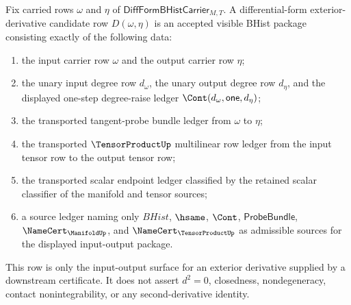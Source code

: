 \begin{definition}
\label{def:diffform-exterior-derivative-candidate-row}
Fix carried rows $\omega$ and $\eta$ of
$\mathsf{DiffFormBHistCarrier}_{M,T}$. A differential-form
exterior-derivative candidate row $D(\omega,\eta)$ is an accepted visible
BHist package consisting exactly of the following data:
\begin{enumerate}
  \item the input carrier row $\omega$ and the output carrier row $\eta$;
  \item the unary input degree row $d_\omega$, the unary output degree row
  $d_\eta$, and the displayed one-step degree-raise ledger
  $\Cont(d_\omega,\mathsf{one},d_\eta)$;
  \item the transported tangent-probe bundle ledger from $\omega$ to $\eta$;
  \item the transported $\TensorProductUp$ multilinear row ledger from the
  input tensor row to the output tensor row;
  \item the transported scalar endpoint ledger classified by the retained
  scalar classifier of the manifold and tensor sources;
  \item a source ledger naming only $BHist$, $\hsame$, $\Cont$,
  $\mathsf{ProbeBundle}$, $\NameCert_{\ManifoldUp}$, and
  $\NameCert_{\TensorProductUp}$ as admissible sources for the displayed
  input-output package.
\end{enumerate}
This row is only the input-output surface for an exterior derivative supplied
by a downstream certificate. It does not assert $d^2=0$, closedness,
nondegeneracy, contact nonintegrability, or any second-derivative identity.
\end{definition}

